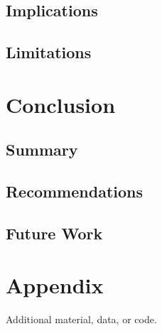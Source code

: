 \documentclass[12pt,a4paper]{report}
\begin{document}
\section{Implications}
\section{Limitations}

\chapter{Conclusion}
\section{Summary}
\section{Recommendations}
\section{Future Work}




\appendix
\chapter{Appendix}
Additional material, data, or code.
\end{document}
